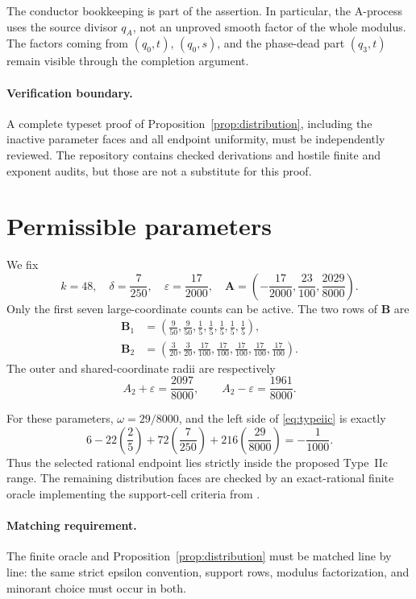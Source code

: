 \documentclass[11pt]{amsart}
\theoremstyle{definition}
\begin{document}
The conductor bookkeeping is part of the assertion.  In particular, the
A-process uses the source divisor $q_A$, not an unproved smooth factor of the
whole modulus.  The factors coming from $(q_0,t)$, $(q_0,s)$, and the
phase-dead part $(q_3,t)$ remain visible through the completion argument.

\paragraph{Verification boundary.}
A complete typeset proof of Proposition~\ref{prop:distribution}, including
the inactive parameter faces and all endpoint uniformity, must be independently
reviewed.  The repository contains checked derivations and hostile finite and
exponent audits, but those are not a substitute for this proof.

\section{Permissible parameters}\label{sec:parameters}

We fix
\begin{equation}\label{eq:parameters}
 k=48,\quad
 \delta=\frac7{250},\quad
 \varepsilon=\frac{17}{2000},\quad
 \mathbf A=\left(-\frac{17}{2000},\frac{23}{100},
                         \frac{2029}{8000}\right).
\end{equation}
Only the first seven large-coordinate counts can be active.  The two rows of
$\mathbf B$ are
\begin{align*}
 \mathbf B_1&=\left(\frac9{50},\frac9{50},
  \frac15,\frac15,\frac15,\frac15,\frac15\right),\\
 \mathbf B_2&=\left(\frac3{20},\frac3{20},
  \frac{17}{100},\frac{17}{100},\frac{17}{100},
  \frac{17}{100},\frac{17}{100}\right).
\end{align*}
The outer and shared-coordinate radii are respectively
\[
 A_2+\varepsilon=\frac{2097}{8000},
 \qquad A_2-\varepsilon=\frac{1961}{8000}.
\]

For these parameters, $\omega=29/8000$, and the left side of
\eqref{eq:typeiic} is exactly
\[
  6-22\left(\frac25\right)+72\left(\frac7{250}\right)
      +216\left(\frac{29}{8000}\right)=-\frac1{1000}.
\]
Thus the selected rational endpoint lies strictly inside the proposed
Type~IIc range.  The remaining distribution faces are checked by an
exact-rational finite oracle implementing the support-cell criteria from
\cite{Stadlmann2026}.

\paragraph{Matching requirement.}
The finite oracle and Proposition~\ref{prop:distribution} must be matched line
by line: the same strict epsilon convention, support rows, modulus
factorization, and minorant choice must occur in both.
\end{document}
